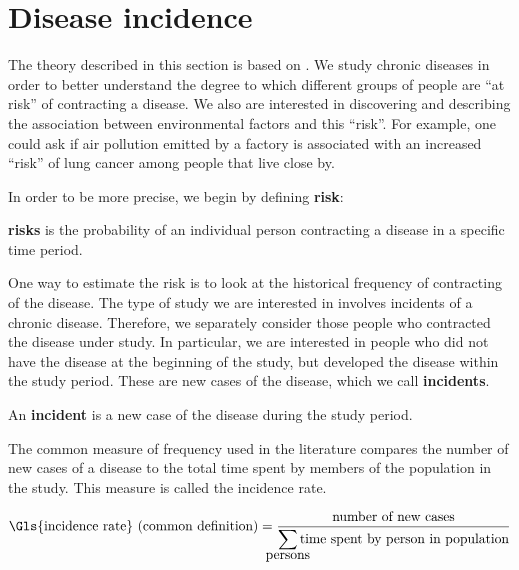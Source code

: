 

\section{Disease incidence}
\label{sec:theory:incidence}

The theory described in this section is based on \citet{rothman2008modern}.
We study chronic diseases in order to better understand the degree to which different groups of people are ``at risk'' of contracting a disease.
We also are interested in discovering and describing the association between environmental factors and this ``risk''.
For example, one could ask if air pollution emitted by a factory is associated with an increased ``risk'' of lung cancer among people that live close by.

In order to be more precise, we begin by defining \textbf{\gls{risk}}:

\begin{defn}
    \textbf{\glspl{risk}} is the probability of an individual person contracting a disease in a specific time period.
\end{defn}

One way to estimate the \gls{risk} is to look at the historical frequency of contracting of the disease.
The type of study we are interested in involves incidents of a chronic disease.
Therefore, we separately consider those people who contracted the disease under study.
In particular, we are interested in people who did not have the disease at the beginning of the study,
but developed the disease within the study period.
These are new cases of the disease, which we call \textbf{\glspl{incident}}.

\begin{defn}
    An \textbf{\gls{incident}} is a new case of the disease during the study period.
\end{defn}

The common measure of frequency used in the literature compares the number of new cases of a disease to the total time spent by members of the population in the study.
This measure is called the \gls{incidence rate}.

\begin{equation}
    \mbox{\Gls{incidence rate} (common definition)} = \frac{\mbox{number of new cases}}
                                {\displaystyle\smashoperator{\sum\limits_{\mbox{persons}}}\mbox{time spent by person in population}}
\end{equation}

